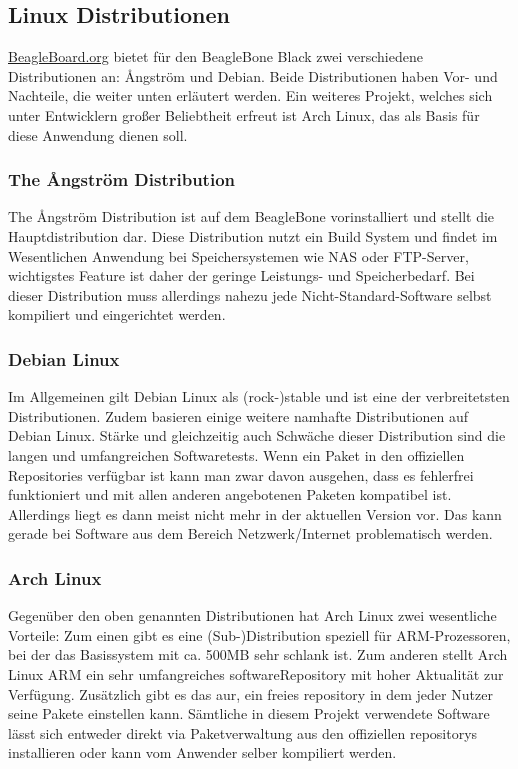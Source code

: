 \subsection{Linux Distributionen}
\href{http://beagleboard.org/}{BeagleBoard.org} bietet für den BeagleBone Black zwei verschiedene Distributionen an: {\AA}ngström und Debian. Beide Distributionen haben Vor- und Nachteile, die weiter unten erläutert werden. Ein weiteres Projekt, welches sich unter Entwicklern großer Beliebtheit erfreut ist Arch Linux, das als Basis für diese Anwendung dienen soll.

\subsubsection{The {\AA}ngström Distribution}
The {\AA}ngström Distribution ist auf dem BeagleBone vorinstalliert und stellt die Hauptdistribution dar. Diese Distribution nutzt ein Build System und findet im Wesentlichen Anwendung bei Speichersystemen wie NAS oder FTP-Server, wichtigstes Feature ist daher der geringe Leistungs- und Speicherbedarf. Bei dieser Distribution muss allerdings nahezu jede Nicht-Standard-Software selbst kompiliert und eingerichtet werden.

\subsubsection{Debian Linux}
Im Allgemeinen gilt Debian Linux als (rock-)stable und ist eine der verbreitetsten Distributionen. Zudem basieren einige weitere namhafte Distributionen auf Debian Linux. Stärke und gleichzeitig auch Schwäche dieser Distribution sind die langen und umfangreichen Softwaretests. Wenn ein Paket in den offiziellen Repositories verfügbar ist kann man zwar davon ausgehen, dass es fehlerfrei funktioniert und mit allen anderen angebotenen Paketen kompatibel ist. Allerdings liegt es dann meist nicht mehr in der aktuellen Version vor. Das kann gerade bei Software aus dem Bereich Netzwerk/Internet problematisch werden.

\subsubsection{Arch Linux}
Gegenüber den oben genannten Distributionen hat Arch Linux zwei wesentliche Vorteile: Zum einen gibt es eine (Sub-)Distribution speziell für ARM-Prozessoren, bei der das Basissystem mit ca. 500MB sehr schlank ist. Zum anderen stellt Arch Linux ARM ein sehr umfangreiches \gls{softwareRepository} mit hoher Aktualität zur Verfügung. Zusätzlich gibt es das \gls{aur}, ein freies \gls{repository} in dem jeder Nutzer seine Pakete einstellen kann. Sämtliche in diesem Projekt verwendete Software lässt sich entweder direkt via Paketverwaltung aus den offiziellen \glspl{repository} installieren oder kann vom Anwender selber kompiliert werden.


